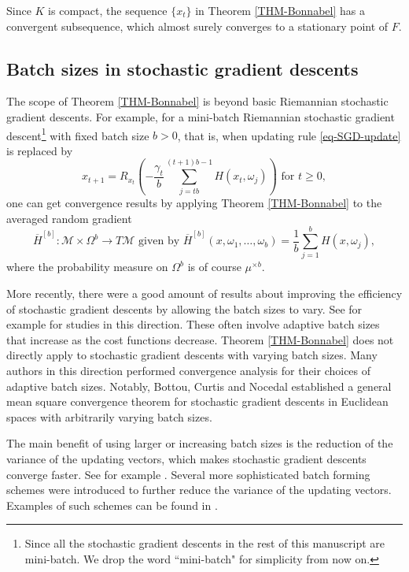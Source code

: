 \documentclass{amsart}
\newcommand{\M}{\mathcal{M}}
\newcommand{\g}{\gamma}
\theoremstyle{plain}
\theoremstyle{definition}
\theoremstyle{remark}
\numberwithin{theorem}{section}
\numberwithin{equation}{section}
\begin{document}
Since $K$ is compact, the sequence $\{x_t\}$ in Theorem \ref{THM-Bonnabel} has a convergent subsequence, which almost surely converges to a stationary point of $F$.

\subsection{Batch sizes in stochastic gradient descents} 

The scope of Theorem \ref{THM-Bonnabel} is beyond basic Riemannian stochastic gradient descents. For example, for a mini-batch Riemannian stochastic gradient descent\footnote{Since all the stochastic gradient descents in the rest of this manuscript are mini-batch. We drop the word ``mini-batch" for simplicity from now on.} with fixed batch size $b>0$, that is, when updating rule \eqref{eq-SGD-update} is replaced by
\begin{equation}\label{eq-SGD-update-b}
x_{t+1} = R_{x_t}\left(-\frac{\g_t}{b} \sum_{j=tb}^{(t+1)b-1} H(x_t,\omega_j)\right) \text{ for } t \geq 0, 
\end{equation}
one can get convergence results by applying Theorem \ref{THM-Bonnabel} to the averaged random gradient 
\begin{equation}\label{eq-def-H-bar-b}
\overline{H}^{[b]}:\M \times \Omega^{b} \rightarrow T\M \text{ given by } \overline{H}^{[b]}(x,\omega_1,\dots,\omega_b) = \frac{1}{b} \sum_{j=1}^{b} H(x,\omega_j),
\end{equation}
where the probability measure on $\Omega^{b}$ is of course $\mu^{\times b}$.

More recently, there were a good amount of results about improving the efficiency of stochastic gradient descents by allowing the batch sizes to vary. See for example \cite{AHJWNOO,ASLHT,BCN,DYJG,DNG,KI,LLXLK,OZXGTK,PKKKQS,SS,UI2024,UI2025} for studies in this direction. These often involve adaptive batch sizes that increase as the cost functions decrease. Theorem \ref{THM-Bonnabel} does not directly apply to stochastic gradient descents with varying batch sizes. Many authors in this direction performed convergence analysis for their choices of adaptive batch sizes. Notably, Bottou, Curtis and Nocedal established a general mean square convergence theorem \cite[Corollary 4.12]{BCN} for stochastic gradient descents in Euclidean spaces with arbitrarily varying batch sizes.

The main benefit of using larger or increasing batch sizes is the reduction of the variance of the updating vectors, which makes stochastic gradient descents converge faster. See for example \cite{QK}. Several more sophisticated batch forming schemes were introduced to further reduce the variance of the updating vectors. Examples of such schemes can be found in \cite{LT,LX,PLW,ZKM,ZZ}.
\end{document}
